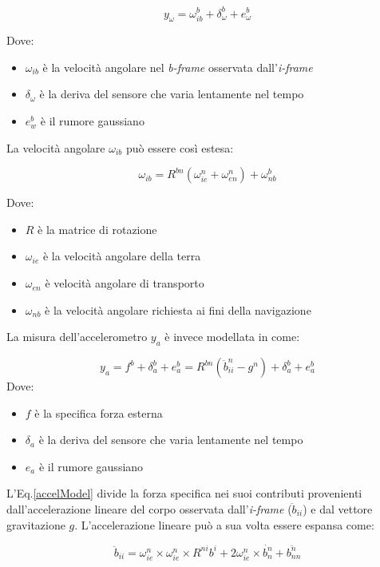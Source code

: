 \begin{equation}
y_\omega = \omega_{ib}^b + \delta_{\omega}^b + e_\omega^b
\end{equation}

Dove:
\begin{itemize}
	\item $\omega_{ib}$ è la velocità angolare nel \textit{b-frame} osservata dall'\textit{i-frame}
	\item $\delta_\omega$ è la deriva del sensore che varia lentamente nel tempo 
	\item $e_w^b$ è il rumore gaussiano
\end{itemize}

La velocità angolare $\omega_{ib}$ può essere così estesa:

\begin{equation}
\omega_{ib} = R^{bn} ( \omega_{ie}^n + \omega_{en}^n) + \omega_{nb}^b
\end{equation}

Dove:
\begin{itemize}
	\item $ R$ è la matrice di rotazione
	\item $\omega_{ie}$ è la velocità angolare della terra
	\item $\omega_{en}$ è velocità angolare di transporto
	\item $\omega_{nb}$ è la velocità angolare richiesta ai fini della navigazione
\end{itemize}

La misura dell'accelerometro $y_a$ è invece modellata in \cite{gyromodel} come:

\begin{equation}
\label{accelModel}
 y_a = f^b + \delta_a^b + e_a^b = R^{bn} (\ddot{b}_{ii}^n - g^n) + \delta_a^b + e_a^b
\end{equation}
Dove:
\begin{itemize}
	\item $f$ è la specifica forza esterna
	\item $\delta_a$ è la deriva del sensore che varia lentamente nel tempo 
	\item $e_a$ è il rumore gaussiano
\end{itemize}
L'Eq.\ref{accelModel} divide la forza specifica nei suoi contributi provenienti dall'accelerazione lineare del corpo osservata dall'\textit{i-frame} ($\ddot{b}_{ii}$) e dal vettore gravitazione $g$. L'accelerazione lineare può a sua volta essere espansa come:

\begin{equation}
\ddot{b}_{ii} = \omega_{ie}^n \times \omega_{ie}^n \times R^{ni}b^i + 2\omega_{ie}^n \times \dot{b_n^n}+\ddot{b_{nn}^n}
\end{equation}

